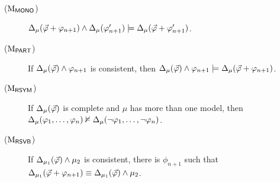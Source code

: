 \begin{description}
	\item[($\mathrm{M}_{\mathsf{MONO}}$)] $\Delta_{\mu}({\vec{\varphi}} + \varphi_{n+1}) \land \Delta_{\mu}(\varphi'_{n+1})\models\Delta_{\mu}({\vec{\varphi}}+\varphi'_{n+1})$.
 
	\item[($\mathrm{M}_{\mathsf{PART}}$)] If $\Delta_\mu({\vec{\varphi}}) \land \varphi_{n+1}$ is consistent, 
		then $\Delta_\mu({\vec{\varphi}}) \land \varphi_{n+1} \models \Delta_{\mu}({\vec{\varphi}}+\varphi_{n+1})$. 

	\item[($\mathrm{M}_{\mathsf{RSYM}}$)] If $\Delta_\mu({\vec{\varphi}})$ is complete and $\mu$ has more than one model, 
		then $\Delta_\mu(\varphi_1,\dots,\varphi_n) \nvDash\Delta_{\mu}(\lnot\varphi_1,\dots,\lnot\varphi_n)$.

	\item[($\mathrm{M}_{\mathsf{RSVB}}$)] If $\Delta_{\mu_1}({\vec{\varphi}})\land\mu_2$ is consistent, 
		there is $\phi_{n+1}$ such that $\Delta_{\mu_1}({\vec{\varphi}}+\varphi_{n+1})\equiv \Delta_{\mu_1}({\vec{\varphi}})\land \mu_2$.




\end{description}

